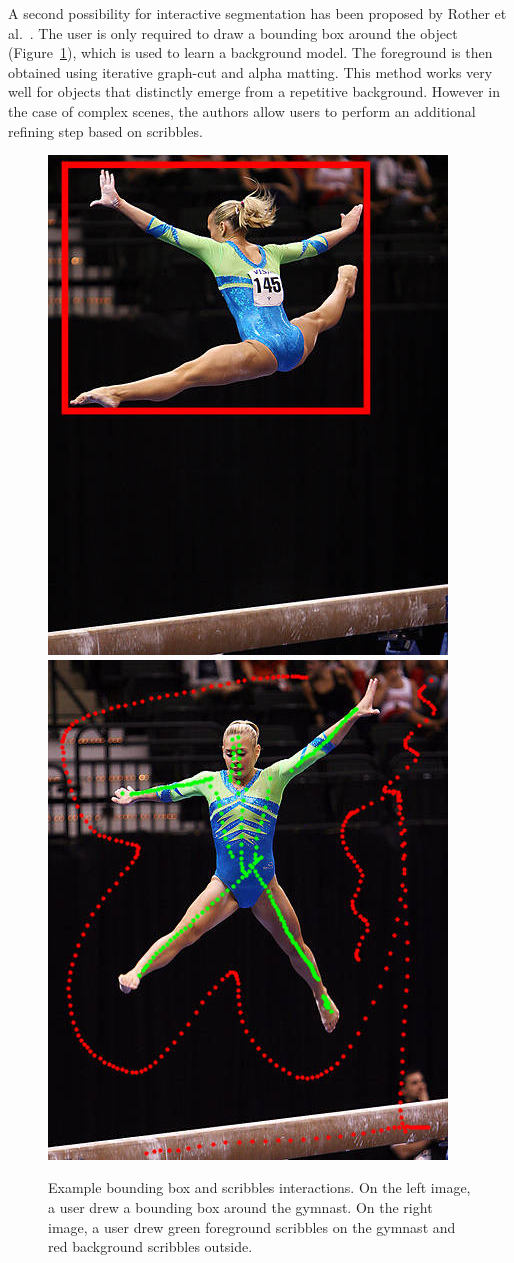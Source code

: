 A second possibility for interactive segmentation has been proposed
by Rother et al.~\cite{rother_grabcut:_2004}.
The user is only required to draw a bounding box around the object
(Figure~\ref{fig:rect_scrib}), which is used to learn
a background model. The foreground is then obtained
using iterative graph-cut and alpha matting.
This method works very well for objects that distinctly emerge
from a repetitive background.
However in the case of complex scenes, the authors allow users
to perform an additional refining step based on scribbles.


\begin{figure}[ht]
\centering
\includegraphics[width=0.45\columnwidth]{assets/img/gymnast_rect.jpg}
\hfill
\includegraphics[width=0.45\columnwidth]{assets/img/gymnast_scrib.jpg}
\caption{Example bounding box and scribbles interactions.
On the left image, a user drew a bounding box around the gymnast.
On the right image, a user drew green foreground scribbles
on the gymnast and red background scribbles outside.}%
\label{fig:rect_scrib}
\end{figure}


